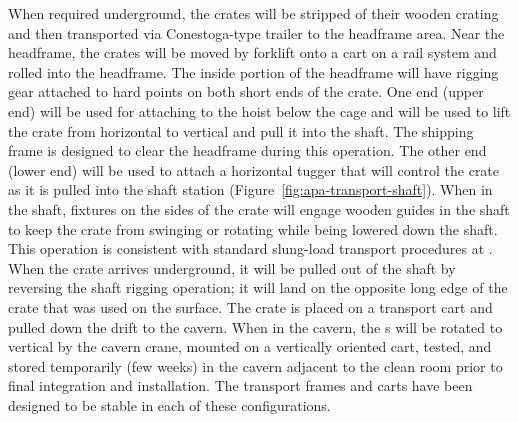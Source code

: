 When required underground, the crates will be stripped of their wooden crating and then transported via Conestoga-type trailer to the headframe area. Near the headframe, the crates will be moved by forklift onto a cart on a rail system and rolled into the headframe. The inside portion of the headframe will have rigging gear attached to hard points on both short ends of the crate. One end (upper end) will be used for attaching to the hoist below the cage and will be used to lift the crate from horizontal to vertical and pull it into the shaft. The shipping frame is designed to clear the headframe during this operation. The other end (lower end) will be used to attach a horizontal tugger that will control the crate as it is pulled into the shaft station (Figure~\ref{fig:apa-transport-shaft}). When in the shaft, fixtures on the sides of the crate will engage wooden guides in the shaft to keep the crate from swinging or rotating while being lowered down the shaft. This operation is consistent with standard slung-load transport procedures at . When the crate arrives underground, it will be pulled out of the shaft by reversing the shaft rigging operation; it will land on the opposite long edge of the crate that was used on the surface. The crate is placed on a transport cart and pulled down the drift to the cavern. When in the cavern, the s will be rotated to vertical by the cavern crane, mounted on a vertically oriented cart, tested, and stored temporarily (few weeks) in the cavern adjacent to the clean room prior to final integration and installation. The transport frames and carts have been designed to be stable in each of these configurations. 

